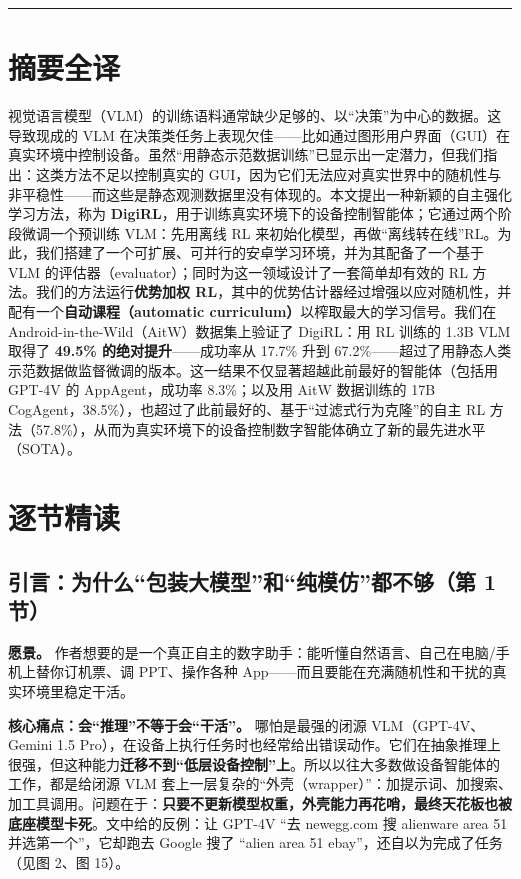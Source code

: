 \documentclass[11pt,UTF8,fontset=fandol]{ctexart}
\begin{document}
\medskip
\hrule
\medskip

\section{摘要全译}
视觉语言模型（VLM）的训练语料通常缺少足够的、以“决策”为中心的数据。这导致现成的 VLM 在决策类任务上表现欠佳——比如通过图形用户界面（GUI）在真实环境中控制设备。虽然“用静态示范数据训练”已显示出一定潜力，但我们指出：这类方法不足以控制真实的 GUI，因为它们无法应对真实世界中的随机性与非平稳性——而这些是静态观测数据里没有体现的。本文提出一种新颖的自主强化学习方法，称为 \textbf{DigiRL}，用于训练真实环境下的设备控制智能体；它通过两个阶段微调一个预训练 VLM：先用离线 RL 来初始化模型，再做“离线转在线”RL。为此，我们搭建了一个可扩展、可并行的安卓学习环境，并为其配备了一个基于 VLM 的评估器（evaluator）；同时为这一领域设计了一套简单却有效的 RL 方法。我们的方法运行\textbf{优势加权 RL}，其中的优势估计器经过增强以应对随机性，并配有一个\textbf{自动课程（automatic curriculum）}以榨取最大的学习信号。我们在 Android-in-the-Wild（AitW）数据集上验证了 DigiRL：用 RL 训练的 1.3B VLM 取得了 \textbf{49.5\% 的绝对提升}——成功率从 17.7\% 升到 67.2\%——超过了用静态人类示范数据做监督微调的版本。这一结果不仅显著超越此前最好的智能体（包括用 GPT-4V 的 AppAgent，成功率 8.3\%；以及用 AitW 数据训练的 17B CogAgent，38.5\%），也超过了此前最好的、基于“过滤式行为克隆”的自主 RL 方法（57.8\%），从而为真实环境下的设备控制数字智能体确立了新的最先进水平（SOTA）。

\section{逐节精读}

\subsection{引言：为什么“包装大模型”和“纯模仿”都不够（第 1 节）}

\textbf{愿景。} 作者想要的是一个真正自主的数字助手：能听懂自然语言、自己在电脑/手机上替你订机票、调 PPT、操作各种 App——而且要能在充满随机性和干扰的真实环境里稳定干活。

\textbf{核心痛点：会“推理”不等于会“干活”。} 哪怕是最强的闭源 VLM（GPT-4V、Gemini 1.5 Pro），在设备上执行任务时也经常给出错误动作。它们在抽象推理上很强，但这种能力\textbf{迁移不到“低层设备控制”上}。所以以往大多数做设备智能体的工作，都是给闭源 VLM 套上一层复杂的“外壳（wrapper）”：加提示词、加搜索、加工具调用。问题在于：\textbf{只要不更新模型权重，外壳能力再花哨，最终天花板也被底座模型卡死}。文中给的反例：让 GPT-4V “去 newegg.com 搜 alienware area 51 并选第一个”，它却跑去 Google 搜了 “alien area 51 ebay”，还自以为完成了任务（见图 2、图 15）。
\end{document}
